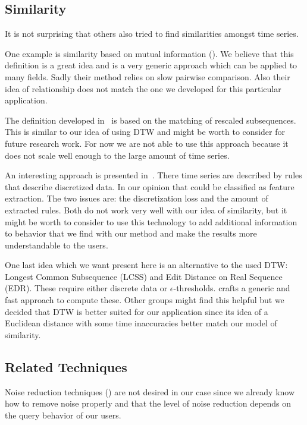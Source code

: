 \subsection{Similarity}
\label{ssec:baseline:prior:sim}

It is not surprising that others also tried to find similarities amongst time series.

One example is similarity based on mutual information (\cite{MISE}). We believe that this definition is a great idea and is a very generic approach which can be applied to many fields. Sadly their method relies on slow pairwise comparison. Also their idea of relationship does not match the one we developed for this particular application.

The definition developed in~\cite{sim1} is based on the matching of rescaled subsequences. This is similar to our idea of using DTW and might be worth to consider for future research work. For now we are not able to use this approach because it does not scale well enough to the large amount of time series.

An interesting approach is presented in~\cite{sim2}. There time series are described by rules that describe discretized data. In our opinion that could be classified as feature extraction. The two issues are: the discretization loss and the amount of extracted rules. Both do not work very well with our idea of similarity, but it might be worth to consider to use this technology to add additional information to behavior that we find with our method and make the results more understandable to the users.

One last idea which we want present here is an alternative to the used DTW\@: Longest Common Subsequence (LCSS) and Edit Distance on Real Sequence (EDR). These require either discrete data or $\epsilon$-thresholds. \cite{sim3} crafts a generic and fast approach to compute these. Other groups might find this helpful but we decided that DTW is better suited for our application since its idea of a Euclidean distance with some time inaccuracies better match our model of similarity.


\subsection{Related Techniques}
\label{ssec:baseline:prior:other}

Noise reduction techniques (\cite{noise1}) are not desired in our case since we already know how to remove noise properly and that the level of noise reduction depends on the query behavior of our users.



